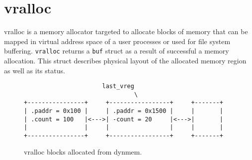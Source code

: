 \chapter{vralloc}

\acf{vralloc} is a memory allocator targeted to allocate blocks of memory
that can be mapped in virtual address space of a user processes or used for
file system buffering. \verb+vralloc+ returns a \verb+buf+ struct as a result
of successful a memory allocation. This struct describes physical layout of
the allocated memory region as well as its status.



\begin{figure}
\begin{verbatim}
                      last_vreg
                               \
+----------------+     +-----------------+     +-------+
| .paddr = 0x100 |     | .paddr = 0x1500 |     |       |
| .count = 100   |<--->| -count = 20     |<--->|       |
|                |     |                 |     |       |
+----------------+     +-----------------+     +-------+
\end{verbatim}
\caption{vralloc blocks allocated from dynmem.}
\label{figure:vralloc_blocks}
\end{figure}
